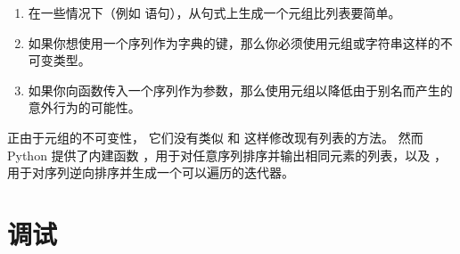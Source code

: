 {\begin{enumerate}

\item 在一些情况下（例如 语句），从句式上生成一个元组比列表要简单。

\item 如果你想使用一个序列作为字典的键，那么你必须使用元组或字符串这样的不可变类型。

\item 如果你向函数传入一个序列作为参数，那么使用元组以降低由于别名而产生的意外行为的可能性。

\end{enumerate}


正由于元组的不可变性， 它们没有类似  和  这样修改现有列表的方法。  
然而 Python 提供了内建函数  ，用于对任意序列排序并输出相同元素的列表，以及  ，用于对序列逆向排序并生成一个可以遍历的迭代器。

  
 


\section{调试}
 
 


}
